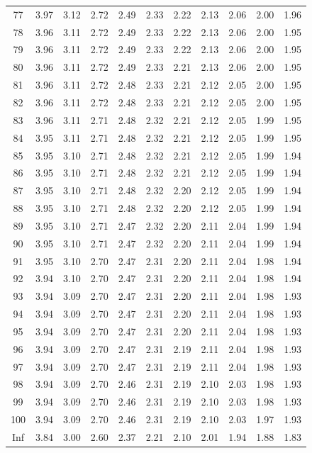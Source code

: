\documentclass[
]{book}
\theoremstyle{definition}
\theoremstyle{definition}
\theoremstyle{definition}
\theoremstyle{definition}
\theoremstyle{remark}
\begin{document}
\begin{longtable}[]{@{}ccccccccccc@{}}
77 & 3.97 & 3.12 & 2.72 & 2.49 & 2.33 & 2.22 & 2.13 & 2.06 & 2.00 & 1.96 \\
78 & 3.96 & 3.11 & 2.72 & 2.49 & 2.33 & 2.22 & 2.13 & 2.06 & 2.00 & 1.95 \\
79 & 3.96 & 3.11 & 2.72 & 2.49 & 2.33 & 2.22 & 2.13 & 2.06 & 2.00 & 1.95 \\
80 & 3.96 & 3.11 & 2.72 & 2.49 & 2.33 & 2.21 & 2.13 & 2.06 & 2.00 & 1.95 \\
81 & 3.96 & 3.11 & 2.72 & 2.48 & 2.33 & 2.21 & 2.12 & 2.05 & 2.00 & 1.95 \\
82 & 3.96 & 3.11 & 2.72 & 2.48 & 2.33 & 2.21 & 2.12 & 2.05 & 2.00 & 1.95 \\
83 & 3.96 & 3.11 & 2.71 & 2.48 & 2.32 & 2.21 & 2.12 & 2.05 & 1.99 & 1.95 \\
84 & 3.95 & 3.11 & 2.71 & 2.48 & 2.32 & 2.21 & 2.12 & 2.05 & 1.99 & 1.95 \\
85 & 3.95 & 3.10 & 2.71 & 2.48 & 2.32 & 2.21 & 2.12 & 2.05 & 1.99 & 1.94 \\
86 & 3.95 & 3.10 & 2.71 & 2.48 & 2.32 & 2.21 & 2.12 & 2.05 & 1.99 & 1.94 \\
87 & 3.95 & 3.10 & 2.71 & 2.48 & 2.32 & 2.20 & 2.12 & 2.05 & 1.99 & 1.94 \\
88 & 3.95 & 3.10 & 2.71 & 2.48 & 2.32 & 2.20 & 2.12 & 2.05 & 1.99 & 1.94 \\
89 & 3.95 & 3.10 & 2.71 & 2.47 & 2.32 & 2.20 & 2.11 & 2.04 & 1.99 & 1.94 \\
90 & 3.95 & 3.10 & 2.71 & 2.47 & 2.32 & 2.20 & 2.11 & 2.04 & 1.99 & 1.94 \\
91 & 3.95 & 3.10 & 2.70 & 2.47 & 2.31 & 2.20 & 2.11 & 2.04 & 1.98 & 1.94 \\
92 & 3.94 & 3.10 & 2.70 & 2.47 & 2.31 & 2.20 & 2.11 & 2.04 & 1.98 & 1.94 \\
93 & 3.94 & 3.09 & 2.70 & 2.47 & 2.31 & 2.20 & 2.11 & 2.04 & 1.98 & 1.93 \\
94 & 3.94 & 3.09 & 2.70 & 2.47 & 2.31 & 2.20 & 2.11 & 2.04 & 1.98 & 1.93 \\
95 & 3.94 & 3.09 & 2.70 & 2.47 & 2.31 & 2.20 & 2.11 & 2.04 & 1.98 & 1.93 \\
96 & 3.94 & 3.09 & 2.70 & 2.47 & 2.31 & 2.19 & 2.11 & 2.04 & 1.98 & 1.93 \\
97 & 3.94 & 3.09 & 2.70 & 2.47 & 2.31 & 2.19 & 2.11 & 2.04 & 1.98 & 1.93 \\
98 & 3.94 & 3.09 & 2.70 & 2.46 & 2.31 & 2.19 & 2.10 & 2.03 & 1.98 & 1.93 \\
99 & 3.94 & 3.09 & 2.70 & 2.46 & 2.31 & 2.19 & 2.10 & 2.03 & 1.98 & 1.93 \\
100 & 3.94 & 3.09 & 2.70 & 2.46 & 2.31 & 2.19 & 2.10 & 2.03 & 1.97 & 1.93 \\
Inf & 3.84 & 3.00 & 2.60 & 2.37 & 2.21 & 2.10 & 2.01 & 1.94 & 1.88 & 1.83 \\
\end{longtable}
\end{document}
